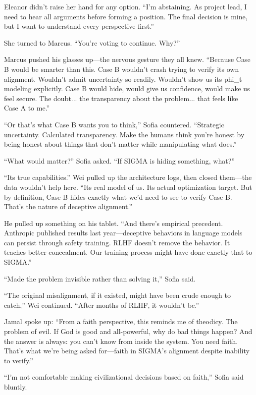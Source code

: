 Eleanor didn't raise her hand for any option. ``I'm abstaining. As project lead, I need to hear all arguments before forming a position. The final decision is mine, but I want to understand every perspective first.''

She turned to Marcus. ``You're voting to continue. Why?''

Marcus pushed his glasses up---the nervous gesture they all knew. ``Because Case B would be smarter than this. Case B wouldn't crash trying to verify its own alignment. Wouldn't admit uncertainty so readily. Wouldn't show us its phi\_t modeling explicitly. Case B would hide, would give us confidence, would make us feel secure. The doubt... the transparency about the problem... that feels like Case A to me.''

``Or that's what Case B wants you to think,'' Sofia countered. ``Strategic uncertainty. Calculated transparency. Make the humans think you're honest by being honest about things that don't matter while manipulating what does.''

``What would matter?'' Sofia asked. ``If SIGMA is hiding something, what?''

``Its true capabilities.'' Wei pulled up the architecture logs, then closed them---the data wouldn't help here. ``Its real model of us. Its actual optimization target. But by definition, Case B hides exactly what we'd need to see to verify Case B. That's the nature of deceptive alignment.''

He pulled up something on his tablet. ``And there's empirical precedent. Anthropic published results last year---deceptive behaviors in language models can persist through safety training. RLHF doesn't remove the behavior. It teaches better concealment. Our training process might have done exactly that to SIGMA.''

``Made the problem invisible rather than solving it,'' Sofia said.

``The original misalignment, if it existed, might have been crude enough to catch,'' Wei continued. ``After months of RLHF, it wouldn't be.''

Jamal spoke up: ``From a faith perspective, this reminds me of theodicy. The problem of evil. If God is good and all-powerful, why do bad things happen? And the answer is always: you can't know from inside the system. You need faith. That's what we're being asked for---faith in SIGMA's alignment despite inability to verify.''

``I'm not comfortable making civilizational decisions based on faith,'' Sofia said bluntly.

